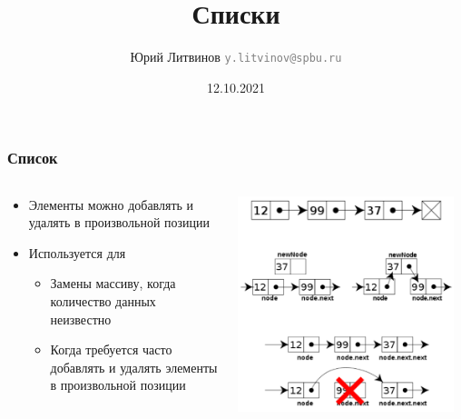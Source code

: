 \documentclass[xetex,mathserif,serif]{beamer}
\title{Списки}
\author[Юрий Литвинов]{Юрий Литвинов \newline \textcolor{gray}{\small\texttt{y.litvinov@spbu.ru}}}
\date{12.10.2021}
\begin{document}
	
	\frame{\titlepage}
	
	\begin{frame}
		\frametitle{Список}
		\begin{columns}
			\begin{column}{0.55\textwidth}
				\begin{itemize}
					\item Элементы можно добавлять и удалять в произвольной позиции
					\item Используется для
					\begin{itemize}
						\item Замены массиву, когда количество данных неизвестно
						\item Когда требуется часто добавлять и удалять элементы в произвольной позиции
					\end{itemize}
				\end{itemize}
			\end{column}
			\begin{column}{0.45\textwidth}
				\begin{center}
					\includegraphics[width=0.95\textwidth]{list.png}
				\end{center}
			\end{column}
		\end{columns}
	\end{frame}
\end{document}

